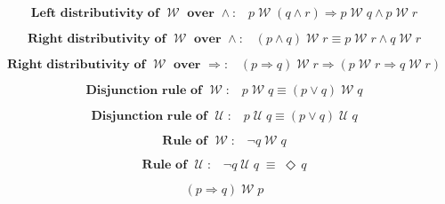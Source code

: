 \documentclass[12pt, fleqn, leqno]{article}
\newcommand{\equivs}{\ensuremath{\;\equiv\;}}       %
\newcommand{\impl}{\ensuremath{\Rightarrow}}        %
\newcommand{\Until}{\;\mathcal{U}\;}
\newcommand{\Wait}{\;\mathcal{W}\;}
\newcommand{\Event}{\Diamond\,}
\newcommand{\spacer}{\vspace{-30pt}}
\begin{document}
\spacer

\begin{equation}\label{E:leftWaitAndDist}
\textbf{Left distributivity of $\Wait$ over $\land$:}\quad p \Wait (q \land r) \impl p \Wait q \land p \Wait r
\end{equation}

\spacer

\begin{equation}\label{E:rightWaitAndDist}
\textbf{Right distributivity of $\Wait$ over $\land$:}\quad (p \land q) \Wait r\equiv p \Wait r \land q \Wait r
\end{equation}

\spacer

\begin{equation}\label{E:rightWaitImplDist}
\textbf{Right distributivity of $\Wait$ over $\impl$:}\quad (p \impl q) \Wait r\impl (p \Wait r \impl q \Wait r)
\end{equation}

\spacer

\begin{equation}\label{E:disjunctWait}
\textbf{Disjunction rule of $\Wait$:}\quad p\Wait q\equiv (p\lor q)\Wait q
\end{equation}

\spacer

\begin{equation}\label{E:disjunctUntil}
\textbf{Disjunction rule of $\Until$:}\quad p\Until q\equiv (p\lor q)\Until q
\end{equation}

\spacer

\begin{equation}\label{E:ruleWait}
\textbf{Rule of $\Wait$:}\quad \neg q \Wait q
\end{equation}

\spacer

\begin{equation}\label{E:ruleUntil}
\textbf{Rule of $\Until$:}\quad \neg q \Until q\equivs \Event q
\end{equation}

\spacer

\begin{equation}\label{E:pImplQWaitP}
(p\impl q)\Wait p
\end{equation}
\end{document}
